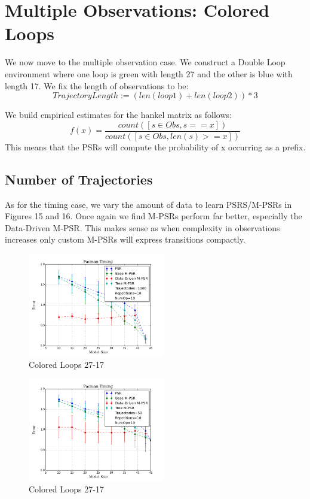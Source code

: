 \section{Multiple Observations: Colored Loops}

We now move to the multiple observation case. We construct a Double Loop environment where one loop is green with length 27 and the other is blue with length 17. We fix the length of observations to be:
\begin{equation*}
TrajectoryLength := (len(loop1) + len(loop2))*3
\end{equation*} 

We build empirical estimates for the hankel matrix as follows:
\begin{equation*}
 f(x)=\dfrac{count([s \in Obs, s==x])}{count([s \in Obs, len(s)>=x])}
\end{equation*}  
This means that the PSRs will compute the probability of x occurring as a prefix.

\subsection{Number of Trajectories}

As for the timing case, we vary the amount of data to learn PSRS/M-PSRs in Figures 15 and 16. Once again we find M-PSRs perform far better, especially the Data-Driven M-PSR. This makes sense as when complexity in observations increases only custom M-PSRs will express transitions compactly.

\begin{figure}[ht!]
\centering
\includegraphics[width=60mm]{uCOREPICS/DLMO/MO_1k.png}
\caption{Colored Loops 27-17\label{overflow}}
\end{figure}

\begin{figure}[ht!]
\centering
\includegraphics[width=60mm]{uCOREPICS/DLMO/MO_50.png}
\caption{Colored Loops 27-17\label{overflow}}
\end{figure}


